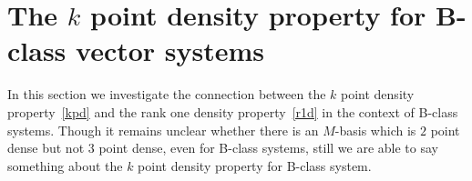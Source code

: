 \documentclass[12pt,oneside,a4paper]{amsart}
\begin{document}



    \section{The \texorpdfstring{$k$}{k} point density property for B-class vector systems}
      \label{sec:kpd}
      In this section we investigate the connection between the $k$ point density property~\eqref{kpd} and
        the rank one density property~\eqref{r1d} in the context of B-class systems.
      Though it remains unclear whether there is an $M$-basis which is $2$ point dense but not $3$ point dense,
        even for B-class systems, still we are able to say something about the $k$ point density property for B-class system.
\end{document}
